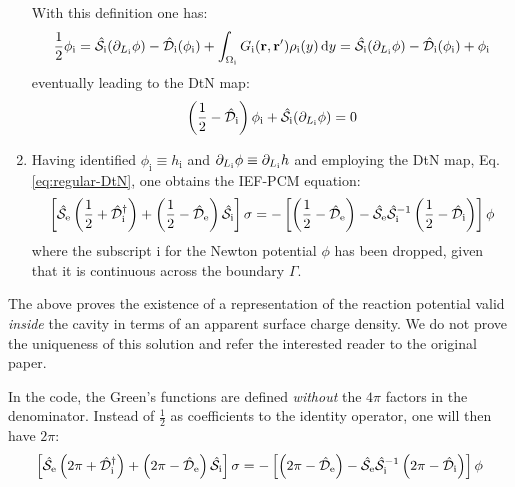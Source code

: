 \begin{enumerate}
    With this definition one has:
    \begin{equation}
      \frac{1}{2}\phi_\mathrm{i} =
      \hat{\mathcal{S}}_\mathrm{i}(\partial_{L_\mathrm{i}} \phi) -
      \hat{\mathcal{D}}_\mathrm{i}(\phi_\mathrm{i}) + \int_{\Omega_\mathrm{i}}G_\mathrm{i}(\mathbf{r}, \mathbf{r}^\prime)\rho_\mathrm{i}(y)\mathop{}\!\mathrm{d} y
      =
      \hat{\mathcal{S}}_\mathrm{i}(\partial_{L_\mathrm{i}} \phi) -
      \hat{\mathcal{D}}_\mathrm{i}(\phi_\mathrm{i}) + \phi_\mathrm{i}
    \end{equation}
    eventually leading to the \acs{DtN} map:
    \begin{equation}\label{eq:regular-DtN}
      \left(\frac{1}{2} - \hat{\mathcal{D}}_\mathrm{i}\right)\phi_\mathrm{i}
      +\hat{\mathcal{S}}_\mathrm{i}(\partial_{L_\mathrm{i}} \phi) = 0
    \end{equation}
  \item Having identified $\phi_\mathrm{i} \equiv h_\mathrm{i}$
    and $\partial_{L_\mathrm{i}} \phi \equiv \partial_{L_\mathrm{i}} h$ and employing the \acs{DtN} map,
    Eq.\eqref{eq:regular-DtN}, one obtains the \acs{IEF}-\acs{PCM} equation:
    \begin{equation}\label{eq:full-IEF}
      \left[ \hat{\mathcal{S}}_\mathrm{e}\left(\frac{1}{2} + \hat{\mathcal{D}}^\dagger_\mathrm{i}\right)
      +
      \left(\frac{1}{2} - \hat{\mathcal{D}}_\mathrm{e}\right)\hat{\mathcal{S}}_\mathrm{i}
      \right]\sigma =
      -\left[\left(\frac{1}{2}-\hat{\mathcal{D}}_\mathrm{e}\right)
      -\hat{\mathcal{S}}_\mathrm{e}\hat{\mathcal{S}}_\mathrm{i}^{-1}
       \left(\frac{1}{2}-\hat{\mathcal{D}}_\mathrm{i}\right)
      \right]\phi
    \end{equation}
    where the subscript $\mathrm{i}$ for the Newton potential $\phi$ has
    been dropped, given that it is continuous across the boundary
    $\Gamma$.
\end{enumerate}
The above proves the existence of a representation of the reaction
potential valid \emph{inside} the cavity in terms of an apparent surface
charge density. We do not prove the uniqueness of this solution and
refer the interested reader to the original
paper.~\autocite{Cances1998-og}

In the code, the Green's functions are defined \emph{without} the $4\pi$
factors in the denominator. Instead of $\frac{1}{2}$ as coefficients to
the identity operator, one will then have $2\pi$:
\begin{equation}\label{eq:full-IEF-2pi}
  \left[ \hat{\mathcal{S}}_\mathrm{e}\left(2\pi + \hat{\mathcal{D}}^\dagger_\mathrm{i}\right)
  +
  \left(2\pi - \hat{\mathcal{D}}_\mathrm{e}\right)\hat{\mathcal{S}}_\mathrm{i}
  \right]\sigma =
  -\left[\left(2\pi-\hat{\mathcal{D}}_\mathrm{e}\right)
  -\hat{\mathcal{S}}_\mathrm{e}\hat{\mathcal{S}}_\mathrm{i}^{-1}
  \left(2\pi-\hat{\mathcal{D}}_\mathrm{i}\right)
  \right]\phi
\end{equation}

